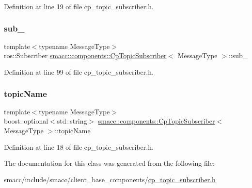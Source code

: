 Definition at line 19 of file cp\+\_\+topic\+\_\+subscriber.\+h.

\mbox{\label{classsmacc_1_1components_1_1CpTopicSubscriber_a87f9c87f6b7c0801dff4fcc7519dbe0e}} 
\subsubsection{\texorpdfstring{sub\+\_\+}{sub\_}}
{\footnotesize\ttfamily template$<$typename Message\+Type$>$ \\
ros\+::\+Subscriber \hyperlink{classsmacc_1_1components_1_1CpTopicSubscriber}{smacc\+::components\+::\+Cp\+Topic\+Subscriber}$<$ Message\+Type $>$\+::sub\+\_\+\hspace{0.3cm}{\ttfamily [private]}}



Definition at line 99 of file cp\+\_\+topic\+\_\+subscriber.\+h.

\mbox{\label{classsmacc_1_1components_1_1CpTopicSubscriber_a90e61b81d9bb33b886162eb41051fe1c}} 
\subsubsection{\texorpdfstring{topic\+Name}{topicName}}
{\footnotesize\ttfamily template$<$typename Message\+Type$>$ \\
boost\+::optional$<$std\+::string$>$ \hyperlink{classsmacc_1_1components_1_1CpTopicSubscriber}{smacc\+::components\+::\+Cp\+Topic\+Subscriber}$<$ Message\+Type $>$\+::topic\+Name}



Definition at line 18 of file cp\+\_\+topic\+\_\+subscriber.\+h.



The documentation for this class was generated from the following file\+:\begin{DoxyCompactItemize}
\item 
smacc/include/smacc/client\+\_\+base\+\_\+components/\hyperlink{cp__topic__subscriber_8h}{cp\+\_\+topic\+\_\+subscriber.\+h}\end{DoxyCompactItemize}
